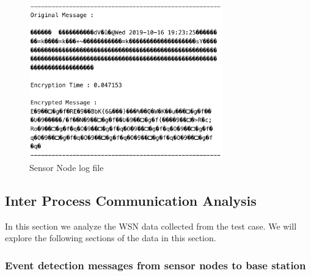 \documentclass[conference]{IEEEtran}
\begin{document}
	\begin{figure}[!h]
		\centering
		\includegraphics[width=3.3in,keepaspectratio]{en}
		\caption{Sensor Node log file}
		\label{Message}
	\end{figure}
	

	\subsection{Inter Process Communication Analysis}
	
	In this section we analyze the WSN data collected from the test case. We will explore the following sections of the data in this section.

	\subsubsection{Event detection messages from sensor nodes to base station}
	
\end{document}
